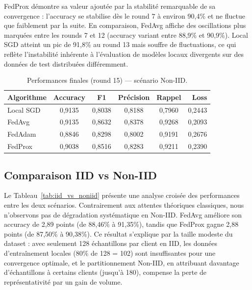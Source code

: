 \documentclass[12pt,a4paper]{report}
\begin{document}
FedProx d\'{e}montre sa valeur ajout\'{e}e par la stabilit\'{e} remarquable de sa convergence : l'accuracy se stabilise d\`{e}s le round 7 \`{a} environ 90,4\% et ne fluctue que faiblement par la suite. En comparaison, FedAvg affiche des oscillations plus marqu\'{e}es entre les rounds 7 et 12 (accuracy variant entre 88,9\% et 90,9\%). Local SGD atteint un pic de 91,8\% au round 13 mais souffre de fluctuations, ce qui refl\`{e}te l'instabilit\'{e} inh\'{e}rente \`{a} l'\'{e}valuation de mod\`{e}les locaux divergents sur des donn\'{e}es de test distribu\'{e}es diff\'{e}remment.

\begin{table}[H]
\centering
\caption{Performances finales (round 15) --- sc\'{e}nario Non-IID.}
\label{tab:results_noniid}
\begin{tabular}{lccccr}
\toprule
\textbf{Algorithme} & \textbf{Accuracy} & \textbf{F1} & \textbf{Pr\'{e}cision} & \textbf{Rappel} & \textbf{Loss} \\
\midrule
Local SGD & 0,9135 & 0,8038 & 0,8188 & 0,7960 & 0,2443 \\
FedAvg    & 0,9135 & 0,8632 & 0,8378 & 0,9268 & 0,2093 \\
FedAdam   & 0,8846 & 0,8298 & 0,8002 & 0,9191 & 0,2676 \\
FedProx   & 0,9038 & 0,8516 & 0,8283 & 0,9211 & 0,2390 \\
\bottomrule
\end{tabular}
\end{table}

\subsection{Comparaison IID vs Non-IID}

Le Tableau~\ref{tab:iid_vs_noniid} pr\'{e}sente une analyse crois\'{e}e des performances entre les deux sc\'{e}narios. Contrairement aux attentes th\'{e}oriques classiques, nous n'observons pas de d\'{e}gradation syst\'{e}matique en Non-IID. FedAvg am\'{e}liore son accuracy de 2,89 points (de 88,46\% \`{a} 91,35\%), tandis que FedProx gagne 2,88 points (de 87,50\% \`{a} 90,38\%). Ce r\'{e}sultat s'explique par la taille modeste du dataset : avec seulement 128 \'{e}chantillons par client en IID, les donn\'{e}es d'entra\^{i}nement locales (80\% de 128 = 102) sont insuffisantes pour une convergence optimale, et le partitionnement Non-IID, en attribuant davantage d'\'{e}chantillons \`{a} certains clients (jusqu'\`{a} 180), compense la perte de repr\'{e}sentativit\'{e} par un gain de volume.
\end{document}
